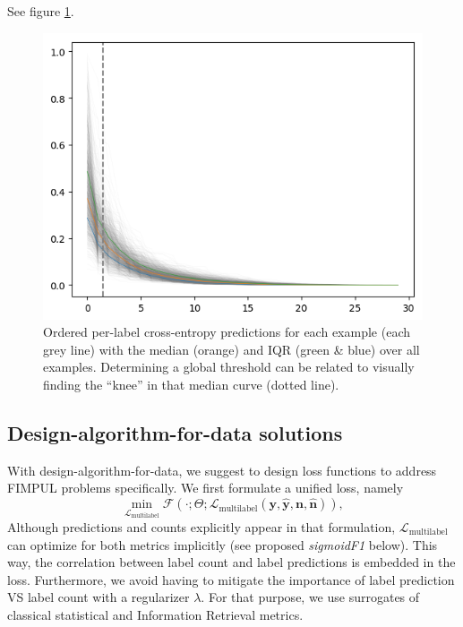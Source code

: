 See figure \ref{fig:knee}.


\begin{figure}[htbp]
\centering
\includegraphics[width=.9\linewidth]{./images/knee.png}
\caption{\label{fig:knee}
Ordered per-label cross-entropy predictions for each example (each grey line) with the median (orange) and IQR (green \& blue) over all examples. Determining a global threshold can be related to visually finding the ``knee'' in that median curve (dotted line).}
\end{figure}


\subsection{Design-algorithm-for-data solutions}

With design-algorithm-for-data, we suggest to design loss functions to address FIMPUL problems specifically. We first formulate a unified loss, namely
%
\begin{equation}
\underset{\mathcal{L}_{\text {multilabel}}} {\min} \mathcal{F}\left(\cdot ;
\Theta; \mathcal{L}_{\text {multilabel}} (\mathbf{y}, \hat{\mathbf{y}},
\mathbf{n}, \hat{\mathbf{n}}) \right),
\end{equation}
%
Although predictions and counts explicitly appear in that formulation,
\(\mathcal{L}_{\text {multilabel}}\) can optimize for both metrics implicitly
(see proposed \emph{sigmoidF1} below). This way, the correlation between label count and label predictions is embedded in the loss. Furthermore, we avoid having to mitigate the importance of label prediction VS label count with a regularizer  $\lambda$. For that purpose, we use surrogates of classical statistical and Information Retrieval metrics.

